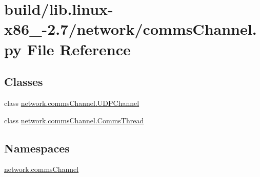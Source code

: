 \hypertarget{build_2lib_8linux-x86__64-2_87_2network_2commsChannel_8py}{}\section{build/lib.linux-\/x86\+\_-\/2.7/network/comms\+Channel.py File Reference}
\label{build_2lib_8linux-x86__64-2_87_2network_2commsChannel_8py}
\subsection*{Classes}
\begin{DoxyCompactItemize}
\item 
class \hyperlink{classnetwork_1_1commsChannel_1_1UDPChannel}{network.\+comms\+Channel.\+U\+D\+P\+Channel}
\item 
class \hyperlink{classnetwork_1_1commsChannel_1_1CommsThread}{network.\+comms\+Channel.\+Comms\+Thread}
\end{DoxyCompactItemize}
\subsection*{Namespaces}
\begin{DoxyCompactItemize}
\item 
 \hyperlink{namespacenetwork_1_1commsChannel}{network.\+comms\+Channel}
\end{DoxyCompactItemize}
